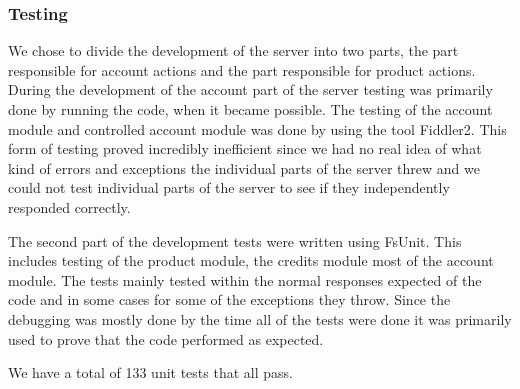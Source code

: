 \subsubsection{Testing}
We chose to divide the development of the server into two parts, the part responsible for account actions and the part responsible for product actions.  During the development of the account part of the server testing was primarily done by running the code, when it became possible. The testing of the account module and controlled account module  was done by using the tool Fiddler2. This form of testing proved incredibly inefficient since we had no real idea of what kind of errors and exceptions the individual parts of the server threw and we could not test individual parts of the server to see if they independently responded correctly.

The second part of the development tests were written using FsUnit. This includes testing of the product module, the credits module most of the account module. The tests mainly tested within the normal responses expected of the code and in some cases for some of the exceptions they throw. Since the debugging was mostly done by the time all of the tests were done it was primarily used to prove that the code performed as expected.

We have a total of 133 unit tests that all pass.
